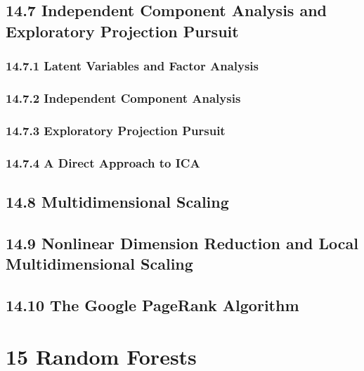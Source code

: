 \documentclass[11pt]{article}
\begin{document}
\subsection{14.7 Independent Component Analysis and Exploratory
Projection
Pursuit}\label{independent-component-analysis-and-exploratory-projection-pursuit}

\subsubsection{14.7.1 Latent Variables and Factor
Analysis}\label{latent-variables-and-factor-analysis}

\subsubsection{14.7.2 Independent Component
Analysis}\label{independent-component-analysis}

\subsubsection{14.7.3 Exploratory Projection
Pursuit}\label{exploratory-projection-pursuit}

\subsubsection{14.7.4 A Direct Approach to
ICA}\label{a-direct-approach-to-ica}

\subsection{14.8 Multidimensional
Scaling}\label{multidimensional-scaling}

\subsection{14.9 Nonlinear Dimension Reduction and Local
Multidimensional
Scaling}\label{nonlinear-dimension-reduction-and-local-multidimensional-scaling}

\subsection{14.10 The Google PageRank
Algorithm}\label{the-google-pagerank-algorithm}

    \section{15 Random Forests}\label{random-forests}
\end{document}
